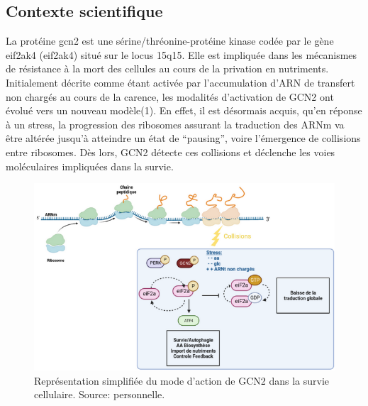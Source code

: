 \documentclass{style}
\begin{document}
\subsection{Contexte scientifique}
La protéine \acrshort{gcn2} est une sérine/thréonine-protéine kinase codée par le gène eif2ak4 (\acrlong{eif2ak4}) situé sur le locus 15q15. Elle est impliquée dans les mécanismes de résistance à la mort des cellules au cours de la privation en nutriments. Initialement décrite comme étant activée par l’accumulation d’ARN de transfert non chargés au cours de la carence, les modalités d’activation de GCN2 ont évolué vers un nouveau modèle(1). En effet, il est désormais acquis, qu’en réponse à un stress, la progression des ribosomes assurant la traduction des ARNm va être altérée jusqu’à atteindre un état de “pausing”, voire l’émergence de collisions entre ribosomes. Dès lors, GCN2 détecte ces collisions et déclenche les voies moléculaires impliquées dans la survie. 
\begin{figure}[H]
  \centering
  \includegraphics[width=15cm]{images/figures/GCN2.png}
  \caption[Représentation simplifiée du mode d'action de GCN2 dans la survie cellulaire.]{Représentation simplifiée du mode d'action de GCN2 dans la survie cellulaire. Source: personnelle.}
  \label{GCN2}
\end{figure}
\end{document}
